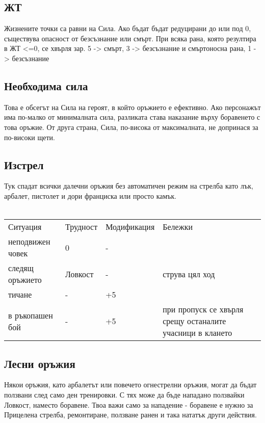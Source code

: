 \begin{footnotesize}
\subsection{ЖТ}
Жизнените точки са равни на Сила.
Ако бъдат бъдат редуцирани до или под 0, съществува опасност от безсъзнание или смърт.
При всяка рана, която резултира в ЖТ <=0, се хвърля зар.
5 -> смърт, 3 -> безсъзнание и смъртоносна рана, 1 -> безсъзнание


\subsection{Необходима сила}
Това е обсегът на Сила на героят, в който оръжието е ефективно.
Ако персонажът има по-малко от минималната сила, разликата става наказание върху боравенето с това оръжие.
От друга страна, Сила, по-висока от максималната, не допринася за по-високи щети.


\subsection{Изстрел}
Тук спадат всички далечни оръжия без автоматичен режим на стрелба като лък, арбалет, пистолет и дори франциска или просто камък.
\\
\\
\begin{tabular}{l | l | l | l }
Ситуация         & Трудност & Модификация & Бележки                                                    \\
неподвижен човек & 0        & -           &                                                            \\
следящ оръжието  & Ловкост  & -           & струва цял ход                                             \\
тичане           & -        & +5          &                                                            \\
в ръкопашен бой  & -        & +5          & при пропуск се хвърля срещу останалите учасници в клането  \\
\end{tabular}


\subsection{Лесни оръжия}
Някои оръжия, като арбалетът или повечето огнестрелни оръжия, могат да бъдат ползвани след само ден тренировки.
С тях може да бъде нападано ползвайки Ловкост, наместо боравене.
Твоа важи само за нападение - боравене е нужно за Прицелена стрелба, ремонтиране, ползване ранен и така нататък други действия.



\end{footnotesize}
